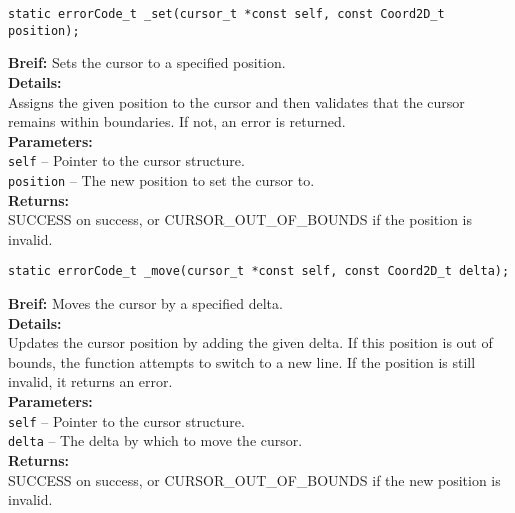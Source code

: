 \begin{verbatim}
static errorCode_t _set(cursor_t *const self, const Coord2D_t position);
\end{verbatim}
\textbf{Breif:} Sets the cursor to a specified position. \\
\textbf{Details:} \\
\hspace*{1cm}Assigns the given position to the cursor and then validates that the cursor remains within boundaries. If not, an error is returned. \\
\textbf{Parameters:} \\
\hspace*{1cm}\texttt{self} -- Pointer to the cursor structure. \\
\hspace*{1cm}\texttt{position} -- The new position to set the cursor to. \\
\textbf{Returns:} \\
\hspace*{1cm}SUCCESS on success, or CURSOR\_OUT\_OF\_BOUNDS if the position is invalid. \\[1em]

\begin{verbatim}
static errorCode_t _move(cursor_t *const self, const Coord2D_t delta);
\end{verbatim}
\textbf{Breif:} Moves the cursor by a specified delta. \\
\textbf{Details:} \\
\hspace*{1cm}Updates the cursor position by adding the given delta. If this position is out of bounds, the function attempts to switch to a new line. If the position is still invalid, it returns an error. \\
\textbf{Parameters:} \\
\hspace*{1cm}\texttt{self} -- Pointer to the cursor structure. \\
\hspace*{1cm}\texttt{delta} -- The delta by which to move the cursor. \\
\textbf{Returns:} \\
\hspace*{1cm}SUCCESS on success, or CURSOR\_OUT\_OF\_BOUNDS if the new position is invalid. \\[1em]

